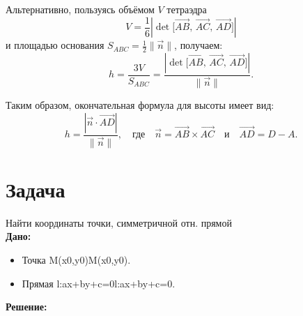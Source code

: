 \documentclass[a4paper,14pt]{extreport} %
\begin{document}
Альтернативно, пользуясь объёмом \(V\) тетраэдра
\[
V = \frac{1}{6} \left| \det\bigl[\vec{AB},\, \vec{AC},\, \vec{AD}\bigr] \right|
\]
и площадью основания \(S_{ABC} = \frac{1}{2}\|\vec{n}\|\), получаем:
\[
h = \frac{3V}{S_{ABC}} = \frac{\left| \det\bigl[\vec{AB},\, \vec{AC},\, \vec{AD}\bigr] \right|}{\|\vec{n}\|}.
\]

Таким образом, окончательная формула для высоты имеет вид:
\[
\boxed{h = \frac{\left| \vec{n} \cdot \vec{AD} \right|}{\|\vec{n}\|}, \quad \text{где} \quad \vec{n} = \vec{AB} \times \vec{AC} \quad \text{и} \quad \vec{AD} = D - A.}
\]

\section*{Задача}
Найти координаты точки, симметричной отн. прямой\\
\textbf{Дано:}\\
\begin{itemize}
\item Точка M(x0,y0)M(x0,y0).
\item Прямая l:ax+by+c=0l:ax+by+c=0.
\end{itemize}
\textbf{Решение:}
\end{document}
